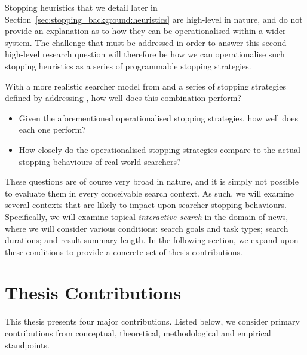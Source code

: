 Stopping heuristics that we detail later in Section~\ref{sec:stopping_background:heuristics} are high-level in nature, and do not provide an explanation as to how they can be operationalised within a wider system. The challenge that must be addressed in order to answer this second high-level research question will therefore be how we can operationalise such stopping heuristics as a series of programmable stopping strategies.

With a more realistic searcher model from  and a series of stopping strategies defined by addressing , how well does this combination perform?

\begin{itemize}
    \item{ Given the aforementioned operationalised stopping strategies, how well does each one perform?}
    \item{ How closely do the operationalised stopping strategies compare to the actual stopping behaviours of real-world searchers?}
\end{itemize}

These questions are of course very broad in nature, and it is simply not possible to evaluate them in every conceivable search context. As such, we will examine several contexts that are likely to impact upon searcher stopping behaviours. Specifically, we will examine topical \emph{interactive search} in the domain of news, where we will consider various conditions: search goals and task types; search durations; and result summary length. In the following section, we expand upon these conditions to provide a concrete set of thesis contributions.

\section{Thesis Contributions}\label{sec:intro:contribs}
This thesis presents four major contributions. Listed below, we consider primary contributions from conceptual, theoretical, methodological and empirical standpoints.

